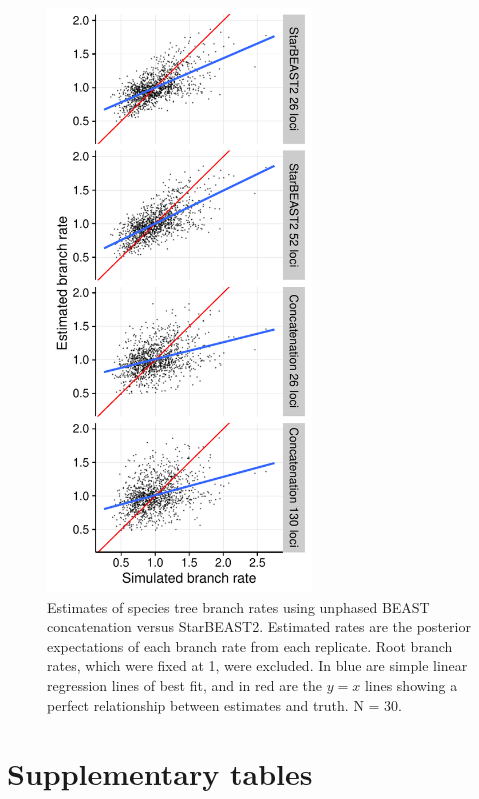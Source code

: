 \documentclass[12pt]{article}
\begin{document}
\begin{figure}[htb!]
\centering
\includegraphics[width=70mm]{branch_rates_unphased.pdf}
\caption
{Estimates of species tree branch rates using unphased BEAST concatenation versus
StarBEAST2. Estimated rates are the posterior expectations of each branch rate
from each replicate. Root branch rates, which were fixed at 1, were excluded.
In blue are simple linear regression lines of best fit, and in red are the $y
= x$ lines showing a perfect relationship between estimates and truth. N = 30.}
\label{fig:branchRates}
\end{figure}

\clearpage

\section{Supplementary tables}
\end{document}
